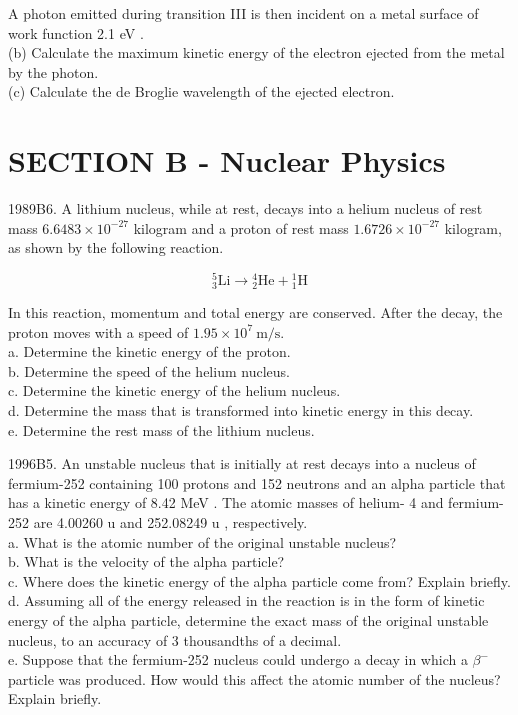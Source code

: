 \begin{enumerate}
A photon emitted during transition III is then incident on a metal surface of work function 2.1 eV .\\
(b) Calculate the maximum kinetic energy of the electron ejected from the metal by the photon.\\
(c) Calculate the de Broglie wavelength of the ejected electron.

\section*{SECTION B - Nuclear Physics}
1989B6. A lithium nucleus, while at rest, decays into a helium nucleus of rest mass $6.6483 \times 10^{-27}$ kilogram and a proton of rest mass $1.6726 \times 10^{-27}$ kilogram, as shown by the following reaction.

$$
{ }_{3}^{5} \mathrm{Li} \rightarrow{ }_{2}^{4} \mathrm{He}+{ }_{1}^{1} \mathrm{H}
$$

In this reaction, momentum and total energy are conserved. After the decay, the proton moves with a speed of $1.95 \times 10^{7} \mathrm{~m} / \mathrm{s}$.\\
a. Determine the kinetic energy of the proton.\\
b. Determine the speed of the helium nucleus.\\
c. Determine the kinetic energy of the helium nucleus.\\
d. Determine the mass that is transformed into kinetic energy in this decay.\\
e. Determine the rest mass of the lithium nucleus.

1996B5. An unstable nucleus that is initially at rest decays into a nucleus of fermium-252 containing 100 protons and 152 neutrons and an alpha particle that has a kinetic energy of 8.42 MeV . The atomic masses of helium- 4 and fermium-252 are 4.00260 u and 252.08249 u , respectively.\\
a. What is the atomic number of the original unstable nucleus?\\
b. What is the velocity of the alpha particle?\\
c. Where does the kinetic energy of the alpha particle come from? Explain briefly.\\
d. Assuming all of the energy released in the reaction is in the form of kinetic energy of the alpha particle, determine the exact mass of the original unstable nucleus, to an accuracy of 3 thousandths of a decimal.\\
e. Suppose that the fermium-252 nucleus could undergo a decay in which a $\beta^{-}$particle was produced. How would this affect the atomic number of the nucleus? Explain briefly.


\end{enumerate}
